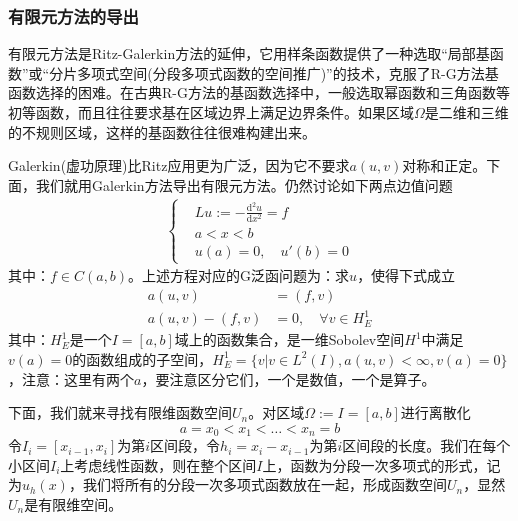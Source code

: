         \subsubsection{有限元方法的导出}
            \label{subsubsec:有限元方法的导出}
            \par
            有限元方法是Ritz-Galerkin方法的延伸，它用样条函数提供了一种选取“局部基函数”或“分片多项式空间(分段多项式函数的空间推广)”的技术，克服了R-G方法基函数选择的困难。在古典R-G方法的基函数选择中，一般选取幂函数和三角函数等初等函数，而且往往要求基在区域边界上满足边界条件。如果区域$\Omega$是二维和三维的不规则区域，这样的基函数往往很难构建出来。
            \par
            Galerkin(虚功原理)比Ritz应用更为广泛，因为它不要求$a(u,v)$对称和正定。下面，我们就用Galerkin方法导出有限元方法。仍然讨论如下两点边值问题
            \begin{align}
                \label{常微的两点边值问题3}
                \left\{
                    \begin{aligned}
                    &Lu:= - \frac{\mathrm{d} ^2u}{\mathrm{d} x^2} = f\\
                    &a<x<b\\
                    &u(a) = 0,\quad u'(b ) = 0
                    \end{aligned}
                \right.
            \end{align}
            其中：$f\in C(a,b)$。上述方程对应的G泛函问题为：求$u$，使得下式成立
            \begin{align*}
                a(u,v) & = (f,v) \\
                a(u,v) - (f,v) & = 0,\quad \forall v\in H_E^1
            \end{align*}
            其中：$H_E^1$是一个$I = [a,b]$域上的函数集合，是一维Sobolev空间$H^1$中满足$v(a) = 0$的函数组成的子空间，$H_E^1 = \{ v|v\in L^2(I),a(u,v)<\infty,v(a) = 0\}$，注意：这里有两个$a$，要注意区分它们，一个是数值，一个是算子。
            \par
            下面，我们就来寻找有限维函数空间$U_n$。对区域$\Omega :=I = [a,b]$进行离散化
            \[
                a = x_0 < x_1 <\dots < x_n = b
            \]
            令$I_i = [x_{i-1}, x_i]$为第$i$区间段，令$h_i = x_i - x_{i-1}$为第$i$区间段的长度。我们在每个小区间$I_i$上考虑线性函数，则在整个区间$I$上，函数为分段一次多项式的形式，记为$u_h(x)$，我们将所有的分段一次多项式函数放在一起，形成函数空间$U_n$，显然$U_n$是有限维空间。
